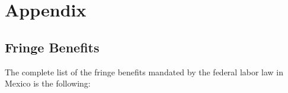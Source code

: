 \documentclass{svjour3}                     %
\begin{document}



\renewcommand{\thesection}{\Alph{section}}
\setcounter{figure}{0}  \renewcommand{\thefigure}{A1.\arabic{figure}}
\setcounter{table}{0}   \renewcommand{\thetable}{A1.\arabic{table}}
\setcounter{section}{0}
\section{Appendix} \label{section:appendix}
\subsection{Fringe Benefits} \label{section:fringe}
The complete list of the fringe benefits mandated by the federal labor law in Mexico is the following:
\end{document}
